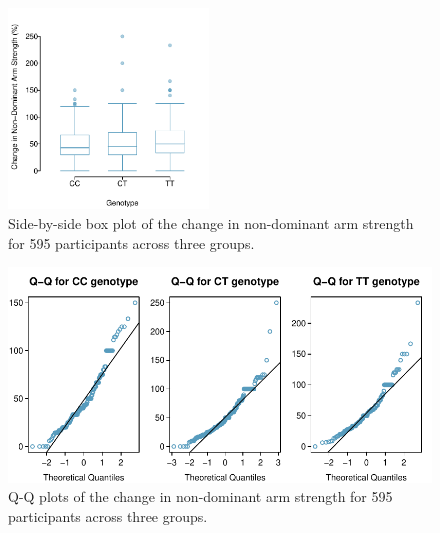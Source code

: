 \begin{figure}[h]
	\centering
	\includegraphics[width=0.475\textwidth]{ch_inference_for_means_oi_biostat/figures/famussBoxPlot/famussBoxPlot}
	\caption{Side-by-side box plot of the change in non-dominant arm strength for 595 participants across three groups.}
	\label{famussBoxPlot}
\end{figure}

\begin{figure}[h]
	\centering
	\includegraphics[width=\textwidth]{ch_inference_for_means_oi_biostat/figures/famussNormal/famussNormal}
	\caption{Q-Q plots of the change in non-dominant arm strength for 595 participants across three groups.}
	\label{famussNormal}
\end{figure}



